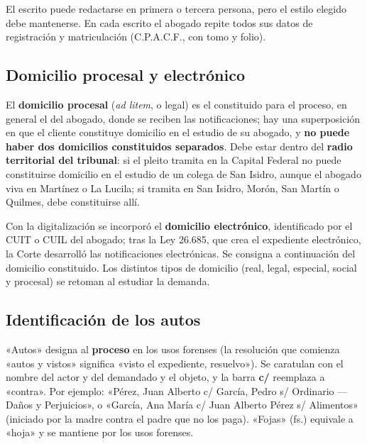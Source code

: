 \documentclass[12pt,oneside]{book}
\begin{document}
El escrito puede redactarse en primera o tercera persona, pero el estilo elegido debe mantenerse. En cada escrito el abogado repite todos sus datos de registración y matriculación (C.P.A.C.F., con tomo y folio). %

\subsection{Domicilio procesal y electrónico}

El \textbf{domicilio procesal} (\textit{ad litem}, o legal) es el constituido para el proceso, en general el del abogado, donde se reciben las notificaciones; hay una superposición en que el cliente constituye domicilio en el estudio de su abogado, y \textbf{no puede haber dos domicilios constituidos separados}. Debe estar dentro del \textbf{radio territorial del tribunal}: si el pleito tramita en la Capital Federal no puede constituirse domicilio en el estudio de un colega de San Isidro, aunque el abogado viva en Martínez o La Lucila; si tramita en San Isidro, Morón, San Martín o Quilmes, debe constituirse allí.

Con la digitalización se incorporó el \textbf{domicilio electrónico}, identificado por el CUIT o CUIL del abogado; tras la Ley 26.685, que crea el expediente electrónico, la Corte desarrolló las notificaciones electrónicas. Se consigna a continuación del domicilio constituido. Los distintos tipos de domicilio (real, legal, especial, social y procesal) se retoman al estudiar la demanda.

\subsection{Identificación de los autos}

«Autos» designa al \textbf{proceso} en los usos forenses (la resolución que comienza «autos y vistos» significa «visto el expediente, resuelvo»). Se caratulan con el nombre del actor y del demandado y el objeto, y la barra \textbf{c/} reemplaza a «contra». Por ejemplo: «Pérez, Juan Alberto c/ García, Pedro s/ Ordinario --- Daños y Perjuicios», o «García, Ana María c/ Juan Alberto Pérez s/ Alimentos» (iniciado por la madre contra el padre que no los paga). «Fojas» (fs.) equivale a «hoja» y se mantiene por los usos forenses.
\end{document}
